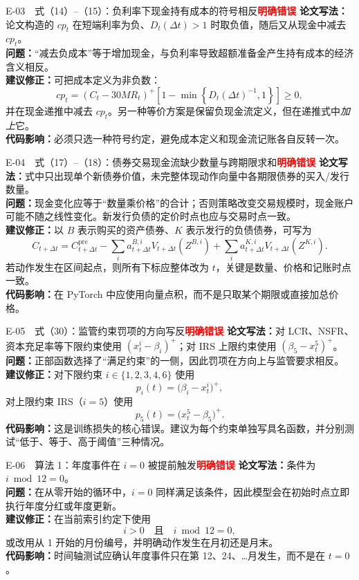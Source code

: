 \documentclass[UTF8,11pt,a4paper,fontset=fandol]{ctexart}
\newcommand{\tagdefinite}{\textcolor{red}{\textbf{明确错误}}}
\newcommand{\original}{\textbf{论文写法：}}
\newcommand{\problem}{\textbf{问题：}}
\newcommand{\revision}{\textbf{建议修正：}}
\newcommand{\impact}{\textbf{代码影响：}}
\begin{document}
\begin{fixbox}{E-03　式（14）--（15）：负利率下现金持有成本的符号相反\hfill\tagdefinite}
\original 论文构造的 $cp_t$ 在短端利率为负、$D_t(\Delta t)>1$ 时取负值，随后又从现金中减去 $cp_t$。\\
\problem “减去负成本”等于增加现金，与负利率导致超额准备金产生持有成本的经济含义相反。\\
\revision 可把成本定义为非负数：
\[
 cp_t=(C_t-30MR_t)^+
 \left[1-\min\left\{D_t(\Delta t)^{-1},1\right\}\right]\ge0,
\]
并在现金递推中减去 $cp_t$。另一种等价方案是保留负现金流定义，但在递推式中\emph{加上}它。\\
\impact 必须只选一种符号约定，避免成本定义和现金流记账各自反转一次。
\end{fixbox}

\begin{fixbox}{E-04　式（17）--（18）：债券交易现金流缺少数量与跨期限求和\hfill\tagdefinite}
\original 式中只出现单个新债券价值，未完整体现动作向量中各期限债券的买入/发行数量。\\
\problem 现金变化应等于“数量乘价格”的合计；否则策略改变交易规模时，现金账户可能不随之线性变化。新发行负债的定价时点也应与交易时点一致。\\
\revision 以 $B$ 表示购买的资产债券、$K$ 表示发行的负债债券，可写为
\[
 C_{t+\Delta t}=C_{t+\Delta t}^{\mathrm{pre}}
 -\sum_i a_{t+\Delta t}^{B,i}V_{t+\Delta t}(Z^{B,i})
 +\sum_i a_{t+\Delta t}^{K,i}V_{t+\Delta t}(Z^{K,i}).
\]
若动作发生在区间起点，则所有下标应整体改为 $t$，关键是数量、价格和记账时点一致。\\
\impact 在 PyTorch 中应使用向量点积，而不是只取某个期限或直接加总价格。
\end{fixbox}

\begin{fixbox}{E-05　式（30）：监管约束罚项的方向写反\hfill\tagdefinite}
\original 对 LCR、NSFR、资本充足率等下限约束使用 $(x_t^i-\beta_i)^+$；对 IRS 上限约束使用 $(\beta_5-x_t^5)^+$。\\
\problem 正部函数选择了“满足约束”的一侧，因此罚项在方向上与监管要求相反。\\
\revision 对下限约束 $i\in\{1,2,3,4,6\}$ 使用
\[
  p_i(t)=\bigl(\beta_i-x_t^i\bigr)^+,
\]
对上限约束 IRS（$i=5$）使用
\[
  p_5(t)=\bigl(x_t^5-\beta_5\bigr)^+.
\]
\impact 这是训练损失的核心错误。建议为每个约束单独写具名函数，并分别测试“低于、等于、高于阈值”三种情况。
\end{fixbox}

\begin{fixbox}{E-06　算法 1：年度事件在 $i=0$ 被提前触发\hfill\tagdefinite}
\original 条件为 $i\bmod 12=0$。\\
\problem 在从零开始的循环中，$i=0$ 同样满足该条件，因此模型会在初始时点立即执行年度分红或年度更新。\\
\revision 在当前索引约定下使用
\[
  i>0\quad\text{且}\quad i\bmod 12=0,
\]
或改用从 1 开始的月份编号，并明确动作发生在月初还是月末。\\
\impact 时间轴测试应确认年度事件只在第 12、24、\ldots 月发生，而不是在 $t=0$。
\end{fixbox}
\end{document}
